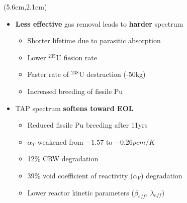 \begin{frame}
\begin{textblock*}{12.4cm}
\begin{columns}
		\column[t]{6cm}
		\begin{textblock*}{7.3cm}(5.6cm,2.1cm) %
		\begin{itemize}
			\itemsep=1em
			\item<1-> \textbf{Less effective} gas removal leads to 
			\textbf{harder} 
			spectrum
			\begin{itemize}
				\itemsep=0.5em
				\item Shorter lifetime due to parasitic absorption
				\item Lower $^{235}$U fission rate
				\item Faster rate of $^{238}$U destruction (-50kg)
				\item Increased breeding of fissile Pu
			\end{itemize}
			
			\item<2-> TAP spectrum \textbf{softens toward EOL}
			\begin{itemize}
				\itemsep=0.5em
				\item Reduced fissile Pu breeding after 11yrs
				\item $\alpha_T$ weakened 
				from $-1.57$ to $-0.26pcm/K$
				\item 12\% CRW degradation
				\item 39\% void coefficient of reactivity ($\alpha_V$) 
				degradation
				\item Lower reactor kinetic parameters ($\beta_{eff}$, 
				$\lambda_{eff}$)
			\end{itemize} 
		\end{itemize}
	
		\end{textblock*}
	
	
	\end{columns}
\end{textblock*}
\end{frame}


